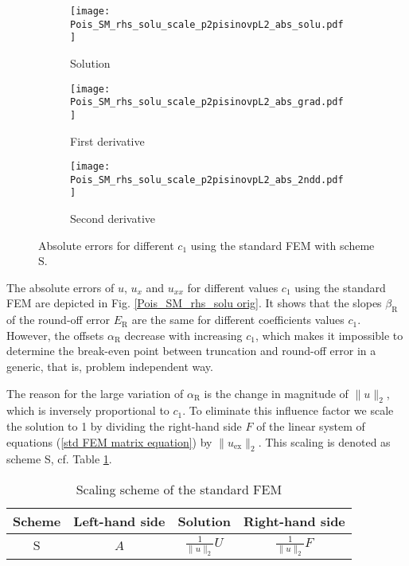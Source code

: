 \documentclass[final,3p]{elsarticle}
\begin{document}
\begin{figure}[!ht]
    \begin{subfigure}{5.5cm}
        \texttt{[image: Pois\_SM\_rhs\_solu\_scale\_p2pisinovpL2\_abs\_solu.pdf]}
        \caption{Solution}
        \label{Fig:Pois_SM_rhs_solu_scale_p2pisinovpL2_abs_solu}
    \end{subfigure}
    \begin{subfigure}{5.5cm}
        \texttt{[image: Pois\_SM\_rhs\_solu\_scale\_p2pisinovpL2\_abs\_grad.pdf]}
        \caption{First derivative}
        \label{Fig:Pois_SM_rhs_solu_scale_p2pisinovpL2_abs_grad}
    \end{subfigure}
    \begin{subfigure}{5.5cm}
        \texttt{[image: Pois\_SM\_rhs\_solu\_scale\_p2pisinovpL2\_abs\_2ndd.pdf]}
        \caption{Second derivative}
        \label{Fig:Pois_SM_rhs_solu_scale_p2pisinovpL2_abs_2ndd}
    \end{subfigure}
\caption{Absolute errors for different $c_1$ using the standard FEM with scheme $\text{S}$.}    
\label{Pois_SM_rhs_solu S}
\end{figure}

The absolute errors of $u$, $u_{x}$ {and} $u_{xx}$ for different values $c_1$ using the standard FEM are depicted in Fig. \ref{Pois_SM_rhs_solu orig}. It shows that the slopes $\beta _{\text{R}}$ of the round-off error ${E}_{\text{R}}$ are the same for different coefficients values $c_1$. However, the offsets $\alpha_{\text{R}}$ decrease with increasing $c_1$, which makes it impossible to determine the break-even point between truncation and round-off error in a generic, that is, problem independent way.

The reason for the large variation of $\alpha_{\text{R}}$ is the change in magnitude of ${\|u\|_{2}}$, which is inversely proportional to $c_1$. To eliminate this influence factor we scale the solution to 1 by dividing the right-hand side $F$ of the linear system of equations (\ref{std FEM matrix equation}) by $\|u_{\text{ex}}\|_{2}$. This scaling is denoted as scheme S, cf. Table \ref{Table: scaling schemes std FEM}.

\begin{table}[!ht]
\centering
\begin{tabular}{|c|c|c|c|}
\hline  
{Scheme}& Left-hand side & Solution & Right-hand side \\	%
\hline
$\text{S}$ & {$A$} & $\frac{1}{\|u\|_{2}} U$ & $\frac{1}{\|u\|_{2}} F$\\	%
\hline
\end{tabular}
\caption [sss] {Scaling scheme of the standard FEM}
\label{Table: scaling schemes std FEM} 
\end{table}
\end{document}
